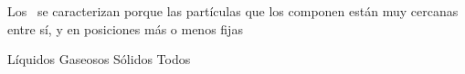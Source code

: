 
\question Los \fillin\ se caracterizan porque las partículas que
los componen están muy cercanas entre sí, y en posiciones más o menos fijas

  \begin{oneparchoices}
    \choice Líquidos
    \choice Gaseosos
    \CorrectChoice Sólidos
    \choice Todos
  \end{oneparchoices}
  \answerline[C]
